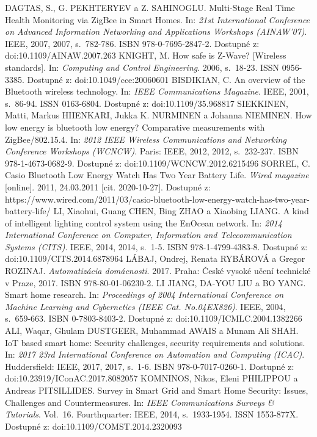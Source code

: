 \documentclass[twoside]{ctuthesis}
\theoremstyle{plain}
\theoremstyle{definition}
\theoremstyle{note}
\begin{document}
\begin{thebibliography}{46}
 DAGTAS, S., G. PEKHTERYEV a Z. SAHINOGLU. Multi-Stage Real Time Health Monitoring via ZigBee in Smart Homes. In: \textit{21st International Conference on Advanced Information Networking and Applications Workshops (AINAW'07)}. IEEE, 2007, 2007, s.~782-786. ISBN 978-0-7695-2847-2. Dostupné z: doi:10.1109/AINAW.2007.263
 KNIGHT, M. How safe is Z-Wave? [Wireless standards]. In: \textit{Computing and Control Engineering}. 2006, s.~18-23. ISSN 0956-3385. Dostupné z: doi:10.1049/cce:20060601
BISDIKIAN, C. An overview of the Bluetooth wireless technology. In: \textit{IEEE Communications Magazine}. IEEE, 2001, s.~86-94. ISSN 0163-6804. Dostupné z: doi:10.1109/35.968817
 SIEKKINEN, Matti, Markus HIIENKARI, Jukka K. NURMINEN a Johanna NIEMINEN. How low energy is bluetooth low energy? Comparative measurements with ZigBee/802.15.4. In: \textit{2012 IEEE Wireless Communications and Networking Conference Workshops (WCNCW)}. Paris: IEEE, 2012, 2012, s.~232-237. ISBN 978-1-4673-0682-9. Dostupné z: doi:10.1109/WCNCW.2012.6215496
SORREL, C. Casio Bluetooth Low Energy Watch Has Two Year Battery Life. \textit{Wired magazine} [online]. 2011, 24.03.2011 [cit. 2020-10-27]. Dostupné z: https://www.wired.com/2011/03/casio-bluetooth-low-energy-watch-has-two-year-battery-life/
LI, Xiaohui, Guang CHEN, Bing ZHAO a Xiaobing LIANG. A kind of intelligent lighting control system using the EnOcean network. In: \textit{2014 International Conference on Computer, Information and Telecommunication Systems (CITS)}. IEEE, 2014, 2014, s.~1-5. ISBN 978-1-4799-4383-8. Dostupné z: doi:10.1109/CITS.2014.6878964
LÁBAJ, Ondrej, Renata RYBÁROVÁ a Gregor ROZINAJ. \textit{Automatizácia domácnosti}. 2017. Praha: České vysoké učení technické v Praze, 2017. ISBN 978-80-01-06230-2.
  LI JIANG, DA-YOU LIU a BO YANG. Smart home research. In: \textit{Proceedings of 2004 International Conference on Machine Learning and Cybernetics (IEEE Cat. No.04EX826)}. IEEE, 2004, s.~659-663. ISBN 0-7803-8403-2. Dostupné z: doi:10.1109/ICMLC.2004.1382266
 ALI, Waqar, Ghulam DUSTGEER, Muhammad AWAIS a Munam Ali SHAH. IoT based smart home: Security challenges, security requirements and solutions. In: \textit{2017 23rd International Conference on Automation and Computing (ICAC)}. Huddersfield: IEEE, 2017, 2017, s.~1-6. ISBN 978-0-7017-0260-1. Dostupné z: doi:10.23919/IConAC.2017.8082057
KOMNINOS, Nikos, Eleni PHILIPPOU a Andreas PITSILLIDES. Survey in Smart Grid and Smart Home Security: Issues, Challenges and Countermeasures. In: \textit{IEEE Communications Surveys \& Tutorials}. Vol.~16. Fourthquarter: IEEE, 2014, s.~1933-1954. ISSN 1553-877X. Dostupné z: doi:10.1109/COMST.2014.2320093

\end{thebibliography}
\end{document}
